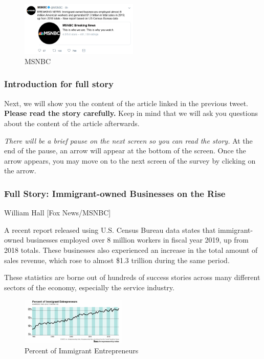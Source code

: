 \documentclass[]{article}
\begin{document}
\begin{figure}
\centering
\includegraphics[width=0.5\textwidth,height=\textheight]{../material/tweets/msnbc_popular.png}
\caption{MSNBC}
\end{figure}

\hypertarget{introduction-for-full-story}{%
\subsubsection{Introduction for full
story}\label{introduction-for-full-story}}

Next, we will show you the content of the article linked in the previous
tweet. \textbf{Please read the story carefully.} Keep in mind that we
will ask you questions about the content of the article afterwards.

\emph{There will be a brief pause on the next screen so you can read the
story.} At the end of the pause, an arrow will appear at the bottom of
the screen. Once the arrow appears, you may move on to the next screen
of the survey by clicking on the arrow.

\hypertarget{full-story-immigrant-owned-businesses-on-the-rise}{%
\subsubsection{Full Story: Immigrant-owned Businesses on the
Rise}\label{full-story-immigrant-owned-businesses-on-the-rise}}

William Hall \textbar{} {[}Fox News/MSNBC{]}

A recent report released using U.S. Census Bureau data states that
immigrant-owned businesses employed over 8 million workers in fiscal
year 2019, up from 2018 totals. These businesses also experienced an
increase in the total amount of sales revenue, which rose to almost
\$1.3 trillion during the same period.

These statistics are borne out of hundreds of success stories across
many different sectors of the economy, especially the service industry.

\begin{figure}
\centering
\includegraphics[width=0.45\textwidth,height=\textheight]{../material/fig/immig_entrepreneurs.png}
\caption{Percent of Immigrant Entrepreneurs}
\end{figure}
\end{document}
